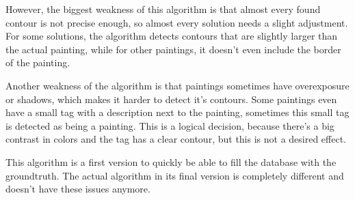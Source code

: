 However, the biggest weakness of this algorithm is that almost every found contour is not precise enough, so almost every solution needs a slight adjustment. For some solutions, the algorithm detects contours that are slightly larger than the actual painting, while for other paintings, it doesn't even include the border of the painting.

Another weakness of the algorithm is that paintings sometimes have overexposure or shadows, which makes it harder to detect it's contours. Some paintings even have a small tag with a description next to the painting, sometimes this small tag is detected as being a painting. This is a logical decision, because there's a big contrast in colors and the tag has a clear contour, but this is not a desired effect.

This algorithm is a first version to quickly be able to fill the database with the groundtruth. The actual algorithm in its final version is completely different and doesn't have these issues anymore.

